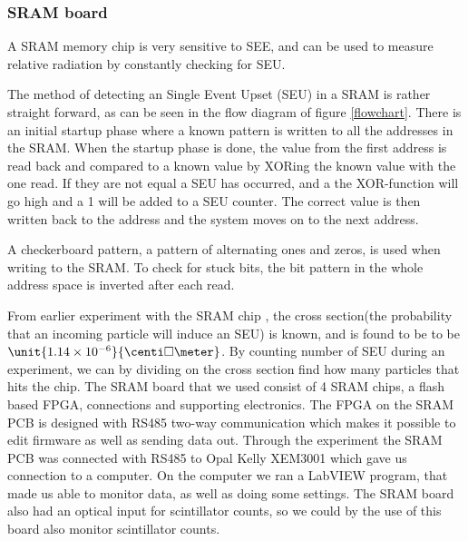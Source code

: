 \documentclass[12pt]{article}
\numberwithin{figure}{section}
\providecommand{\e}[1]{\ensuremath{\times 10^{#1}}}
\begin{document}
\subsubsection{\ac{SRAM} board}
A \ac{SRAM} memory chip is very sensitive to \acf{SEE}, and can be used to measure relative radiation by constantly checking for \ac{SEU}.

The method of detecting an Single Event Upset (SEU) in a \ac{SRAM} is rather straight
forward, as can be seen in the flow diagram of figure \ref{flowchart}. There is an initial startup
phase where a known pattern is written to all the addresses in the \ac{SRAM}. When
the startup phase is done, the value from the first address is read back and compared
to a known value by XORing the known value with the one read. If they are not equal a SEU has occurred,
and a the XOR-function will go high and a 1 will be added to a SEU counter.
The correct value is then written back to the address and the system moves on to the next address.
  
A checkerboard pattern, a pattern of alternating ones and zeros, is used when writing
to the \ac{SRAM}. To check for stuck bits, the bit pattern in the whole address space is inverted after each read. 

From earlier experiment with the \ac{SRAM} chip \cite{arild_master}, the cross section(the probability that an incoming particle will induce an SEU) is known, and is found to be to be $\unit{1.14\e{-6}}{\centi\square\meter}$.
By counting number of SEU during an experiment, we can by dividing on the cross section find how many particles that hits the chip.
The \ac{SRAM} board that we used consist of 4 \ac{SRAM} chips, a flash based \ac{FPGA}, connections and supporting electronics.
The \ac{FPGA} on the \ac{SRAM} PCB is designed with RS485 two-way communication which makes it possible to edit firmware as well as sending data out. 
Through the experiment the \ac{SRAM} PCB was connected with RS485 to Opal Kelly XEM3001 which gave us connection to a computer. On the computer we ran a LabVIEW program, that made us able to monitor data, as well as doing some settings. 
The \ac{SRAM} board also had an optical input for scintillator counts, so we could by the use of this board also monitor scintillator counts.
\end{document}
